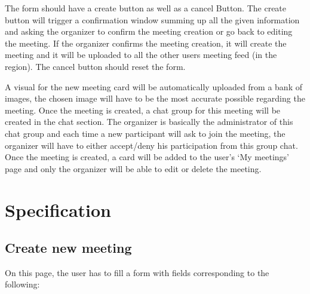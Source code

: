 \documentclass[conference]{IEEEtran}
\begin{document}
The form should have a create button as well as a cancel Button. The create button will trigger a confirmation window summing up all the given information and asking the organizer to confirm the meeting creation or go back to editing the meeting. If the organizer confirms the meeting creation, it will create the meeting and it will be uploaded to all the other users meeting feed (in the region). The cancel button should reset the form.

A visual for the new meeting card will be automatically uploaded from a bank of images, the chosen image will have to be the most accurate possible regarding the meeting.
Once the meeting is created, a chat group for this meeting will be created in the chat section. The organizer is basically the administrator of this chat group and each time a new participant will ask to join the meeting, the organizer will
have to either accept/deny his participation from this group chat.
Once the meeting is created, a card will be added to the user’s ‘My meetings’ page and only the organizer will be able to edit or delete the meeting.

\section{Specification}

\subsection{Create new meeting}

On this page, the user has to fill a form with fields corresponding to the following:
\end{document}
